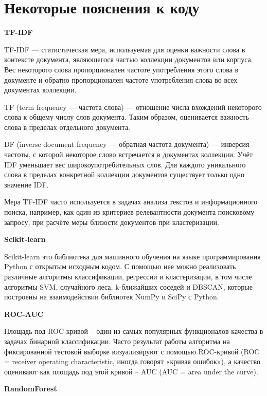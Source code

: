\documentclass[14pt,a4paper]{scrartcl}
\begin{document}
\newpage
\section{Некоторые пояснения к коду}

\item {\bf TF-IDF}

TF-IDF — статистическая мера, используемая для оценки важности слова в контексте документа, являющегося частью коллекции документов или корпуса. Вес некоторого слова пропорционален частоте употребления этого слова в документе и обратно пропорционален частоте употребления слова во всех документах коллекции.

TF (term frequency — частота слова) — отношение числа вхождений некоторого слова к общему числу слов документа. Таким образом, оценивается важность слова в пределах отдельного документа.

DF (inverse document frequency — обратная частота документа) — инверсия частоты, с которой некоторое слово встречается в документах коллекции. Учёт IDF уменьшает вес широкоупотребительных слов. Для каждого уникального слова в пределах конкретной коллекции документов существует только одно значение IDF.

Мера TF-IDF часто используется в задачах анализа текстов и информационного поиска, например, как один из критериев релевантности документа поисковому запросу, при расчёте меры близости документов при кластеризации.

\item {\bf Scikit-learn}

Scikit-learn это библиотека для машинного обучения на языке программирования Python  с открытым исходным кодом. С помощью нее можно реализовать различные алгоритмы классификации, регрессии и кластеризации, в том числе алгоритмы SVM, случайного леса, k-ближайших соседей и DBSCAN, которые построены на взаимодействии библиотек NumPy и SciPy с Python.

\item {\bf ROC-AUC}

Площадь под ROC-кривой – один из самых популярных функционалов качества в задачах бинарной классификации. Часто результат работы алгоритма на фиксированной тестовой выборке визуализируют с помощью ROC-кривой (ROC = receiver operating characteristic, иногда говорят «кривая ошибок»), а качество оценивают как площадь под этой кривой – AUC (AUC = area under the curve). 

\item {\bf RandomForest}
\end{document}
